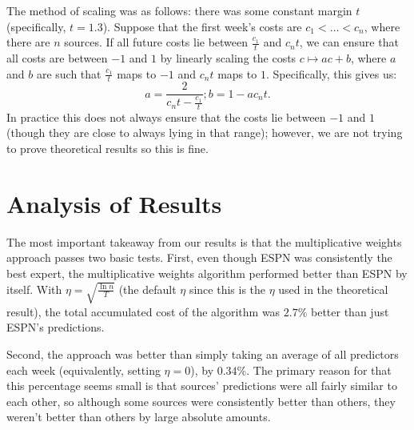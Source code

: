 \documentclass[12pt, final, onecolumn, titlepage]{article}
\theoremstyle{definition}
\begin{document}
The method of scaling was as follows: there was some constant margin $t$ (specifically, $t = 1.3$). Suppose that the first week's costs are $c_1 < \dots < c_n$, where there are $n$ sources. If all future costs lie between $\frac{c_1}{t}$ and $c_nt$, we can ensure that all costs are between $-1$ and $1$ by linearly scaling the costs $c \mapsto ac + b$, where $a$ and $b$ are such that $\frac{c_1}{t}$ maps to $-1$ and $c_nt$ maps to $1$. Specifically, this gives us:
\[a = \frac{2}{c_n t - \frac{c_1}{t}}; b = 1 - ac_nt.\]
In practice this does not always ensure that the costs lie between $-1$ and $1$ (though they are close to always lying in that range); however, we are not trying to prove theoretical results so this is fine.

\section{Analysis of Results}
The most important takeaway from our results is that the multiplicative weights approach passes two basic tests. First, even though ESPN was consistently the best expert, the multiplicative weights algorithm performed better than ESPN by itself. With $\eta = \sqrt{\frac{\ln n}{T}}$ (the default $\eta$ since this is the $\eta$ used in the theoretical result), the total accumulated cost of the algorithm was $2.7\%$ better than just ESPN's predictions.

Second, the approach was better than simply taking an average of all predictors each week (equivalently, setting $\eta = 0$), by $0.34\%$. The primary reason for that this percentage seems small is that sources' predictions were all fairly similar to each other, so although some sources were consistently better than others, they weren't better than others by large absolute amounts.
\end{document}
